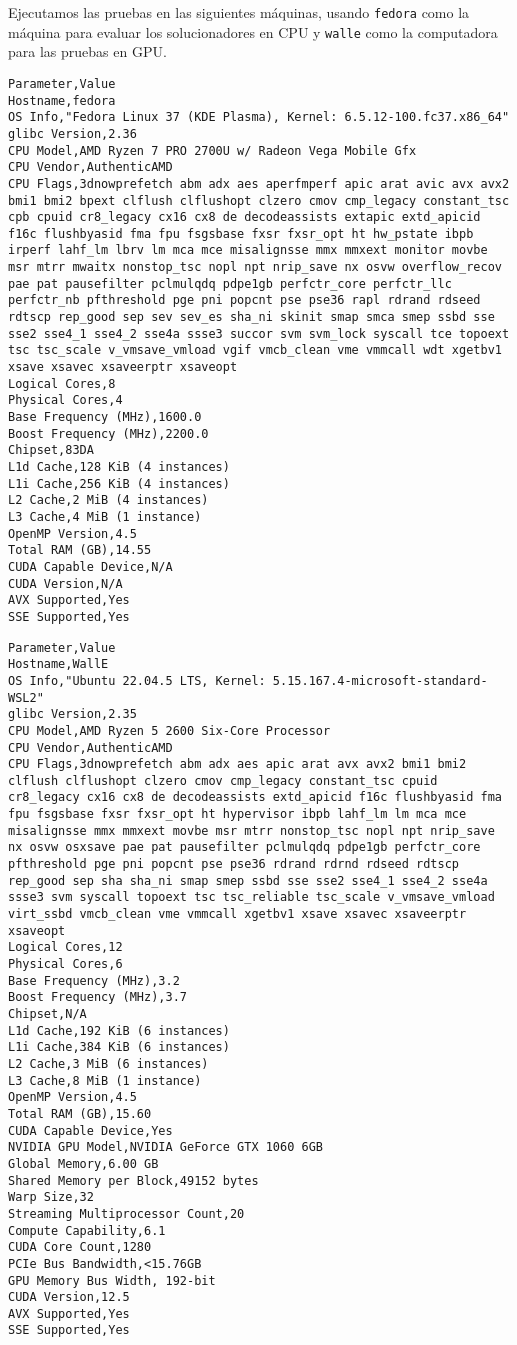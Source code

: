 \documentclass[main.tex]{subfiles}
\begin{document}
Ejecutamos las pruebas en las siguientes máquinas, usando \texttt{fedora} como
la máquina para evaluar los solucionadores en CPU y \texttt{walle} como la
computadora para las pruebas en GPU.

\begin{verbatim}
Parameter,Value
Hostname,fedora
OS Info,"Fedora Linux 37 (KDE Plasma), Kernel: 6.5.12-100.fc37.x86_64"
glibc Version,2.36
CPU Model,AMD Ryzen 7 PRO 2700U w/ Radeon Vega Mobile Gfx
CPU Vendor,AuthenticAMD
CPU Flags,3dnowprefetch abm adx aes aperfmperf apic arat avic avx avx2 bmi1 bmi2 bpext clflush clflushopt clzero cmov cmp_legacy constant_tsc cpb cpuid cr8_legacy cx16 cx8 de decodeassists extapic extd_apicid f16c flushbyasid fma fpu fsgsbase fxsr fxsr_opt ht hw_pstate ibpb irperf lahf_lm lbrv lm mca mce misalignsse mmx mmxext monitor movbe msr mtrr mwaitx nonstop_tsc nopl npt nrip_save nx osvw overflow_recov pae pat pausefilter pclmulqdq pdpe1gb perfctr_core perfctr_llc perfctr_nb pfthreshold pge pni popcnt pse pse36 rapl rdrand rdseed rdtscp rep_good sep sev sev_es sha_ni skinit smap smca smep ssbd sse sse2 sse4_1 sse4_2 sse4a ssse3 succor svm svm_lock syscall tce topoext tsc tsc_scale v_vmsave_vmload vgif vmcb_clean vme vmmcall wdt xgetbv1 xsave xsavec xsaveerptr xsaveopt
Logical Cores,8
Physical Cores,4
Base Frequency (MHz),1600.0
Boost Frequency (MHz),2200.0
Chipset,83DA
L1d Cache,128 KiB (4 instances)
L1i Cache,256 KiB (4 instances)
L2 Cache,2 MiB (4 instances)
L3 Cache,4 MiB (1 instance)
OpenMP Version,4.5
Total RAM (GB),14.55
CUDA Capable Device,N/A
CUDA Version,N/A
AVX Supported,Yes
SSE Supported,Yes
\end{verbatim}

\begin{verbatim}
Parameter,Value
Hostname,WallE
OS Info,"Ubuntu 22.04.5 LTS, Kernel: 5.15.167.4-microsoft-standard-WSL2"
glibc Version,2.35
CPU Model,AMD Ryzen 5 2600 Six-Core Processor
CPU Vendor,AuthenticAMD
CPU Flags,3dnowprefetch abm adx aes apic arat avx avx2 bmi1 bmi2 clflush clflushopt clzero cmov cmp_legacy constant_tsc cpuid cr8_legacy cx16 cx8 de decodeassists extd_apicid f16c flushbyasid fma fpu fsgsbase fxsr fxsr_opt ht hypervisor ibpb lahf_lm lm mca mce misalignsse mmx mmxext movbe msr mtrr nonstop_tsc nopl npt nrip_save nx osvw osxsave pae pat pausefilter pclmulqdq pdpe1gb perfctr_core pfthreshold pge pni popcnt pse pse36 rdrand rdrnd rdseed rdtscp rep_good sep sha sha_ni smap smep ssbd sse sse2 sse4_1 sse4_2 sse4a ssse3 svm syscall topoext tsc tsc_reliable tsc_scale v_vmsave_vmload virt_ssbd vmcb_clean vme vmmcall xgetbv1 xsave xsavec xsaveerptr xsaveopt
Logical Cores,12
Physical Cores,6
Base Frequency (MHz),3.2
Boost Frequency (MHz),3.7
Chipset,N/A
L1d Cache,192 KiB (6 instances)
L1i Cache,384 KiB (6 instances)
L2 Cache,3 MiB (6 instances)
L3 Cache,8 MiB (1 instance)
OpenMP Version,4.5
Total RAM (GB),15.60
CUDA Capable Device,Yes
NVIDIA GPU Model,NVIDIA GeForce GTX 1060 6GB
Global Memory,6.00 GB
Shared Memory per Block,49152 bytes
Warp Size,32
Streaming Multiprocessor Count,20
Compute Capability,6.1
CUDA Core Count,1280
PCIe Bus Bandwidth,<15.76GB
GPU Memory Bus Width, 192-bit
CUDA Version,12.5
AVX Supported,Yes
SSE Supported,Yes
\end{verbatim}
\end{document}
